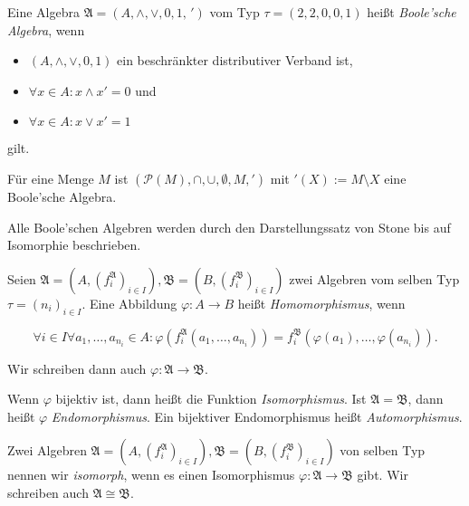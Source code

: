 \begin{definition}\label{def:boolsche_algebra}
    Eine Algebra $\mathfrak{A} = (A, \wedge, \vee, 0, 1, \,')$ vom Typ $\tau = (2,2,0,0,1)$ heißt \emph{Boole'sche Algebra}, wenn
    \begin{itemize}
        \item $(A, \wedge, \vee, 0, 1)$ ein beschränkter distributiver Verband ist,
        \item $\forall x \in A: x \wedge x' = 0$ und
        \item $\forall x \in A: x \vee x' = 1$
    \end{itemize}
    gilt.
\end{definition}

\begin{example}
    Für eine Menge $M$ ist $(\mathcal{P}(M), \cap, \cup, \emptyset, M, ')$ mit $'(X) := M \setminus X$ eine Boole'sche Algebra.
\end{example}

\begin{remark}
    Alle Boole'schen Algebren werden durch den Darstellungssatz von Stone bis auf Isomorphie beschrieben.
\end{remark}

\begin{definition}
    Seien $\mathfrak{A} = (A, (f_i^\mathfrak{A})_{i \in I}), \mathfrak{B} = (B, (f_i^\mathfrak{B})_{i \in I})$ zwei Algebren vom selben Typ $\tau = (n_i)_{i \in I}$. Eine Abbildung $\varphi: A \to B$ heißt \emph{Homomorphismus}, wenn

    $$\forall i \in I \forall a_1, \ldots, a_{n_i} \in A: \varphi(f_i^\mathfrak{A}(a_1, \ldots, a_{n_i})) = f_i^\mathfrak{B}(\varphi(a_1), \ldots, \varphi(a_{n_i})). $$

    Wir schreiben dann auch $\varphi : \mathfrak{A} \to \mathfrak{B}$.

    Wenn $\varphi$ bijektiv ist, dann heißt die Funktion \emph{Isomorphismus}.
    Ist $\mathfrak{A} = \mathfrak{B}$, dann heißt $\varphi$ \emph{Endomorphismus}. Ein bijektiver Endomorphismus heißt \emph{Automorphismus}.
\end{definition}

\begin{definition}
    Zwei Algebren $\mathfrak{A} = (A, (f_i^\mathfrak{A})_{i \in I}), \mathfrak{B} = (B, (f_i^\mathfrak{B})_{i \in I})$ von selben Typ nennen wir \emph{isomorph}, wenn es einen Isomorphismus $\varphi: \mathfrak{A} \to \mathfrak{B}$ gibt. Wir schreiben auch $\mathfrak{A} \cong \mathfrak{B}$.
\end{definition}

